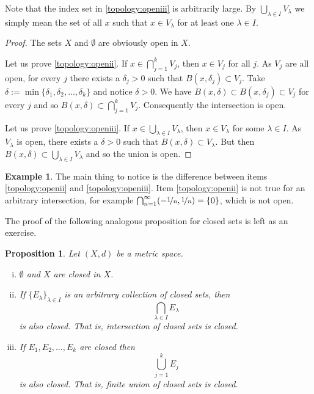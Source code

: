 \documentclass[12pt]{book}
\theoremstyle{plain}
\newtheorem{prop}[thm]{Proposition}
\theoremstyle{remark}
\theoremstyle{definition}
\theoremstyle{exercise}
\theoremstyle{example}
\newtheorem{example}[thm]{Example}
\begin{document}
Note that the index set in \ref{topology:openiii} is arbitrarily large.
By $\bigcup_{\lambda \in I} V_\lambda$ we simply mean the set of
all $x$ such that $x \in V_\lambda$ for at least one $\lambda \in I$.

\begin{proof}
The sets $X$ and $\emptyset$ are obviously open in $X$.

Let us prove \ref{topology:openii}.
If $x \in \bigcap_{j=1}^k V_j$, then $x \in V_j$ for all $j$.
As $V_j$ are all open, for every $j$ there exists a $\delta_j > 0$ 
such that $B(x,\delta_j) \subset V_j$.  Take $\delta := \min \{
\delta_1,\delta_2,\ldots,\delta_k \}$ and notice $\delta > 0$.  We have
$B(x,\delta) \subset B(x,\delta_j) \subset V_j$ for every $j$ and so
$B(x,\delta) \subset \bigcap_{j=1}^k V_j$.  Consequently the intersection is open.

Let us prove \ref{topology:openiii}.
If $x \in \bigcup_{\lambda \in I} V_\lambda$, then $x \in V_\lambda$ for some
$\lambda \in I$.
As $V_\lambda$ is open, there exists a $\delta > 0$
such that $B(x,\delta) \subset V_\lambda$.  But then
$B(x,\delta) \subset \bigcup_{\lambda \in I} V_\lambda$
and so the union is open.
\end{proof}

\begin{example}
The main thing to notice is the difference between
items
\ref{topology:openii} and \ref{topology:openiii}.
Item \ref{topology:openii} is not true for an arbitrary intersection,
for example $\bigcap_{n=1}^\infty (-\nicefrac{1}{n},\nicefrac{1}{n}) = \{ 0
\}$, which is not open.
\end{example}


The proof of the following analogous proposition for closed sets
is left as an exercise.

\begin{prop} \label{prop:topology:closed}
Let $(X,d)$ be a metric space.
\begin{enumerate}[(i)]
\item \label{topology:closedi} $\emptyset$ and $X$ are closed in $X$.
\item \label{topology:closedii} If $\{ E_\lambda \}_{\lambda \in I}$ is
an arbitrary collection of closed sets, then
\begin{equation*}
\bigcap_{\lambda \in I} E_\lambda
\end{equation*}
is also closed.  That is, intersection of closed sets is closed.
\item \label{topology:closediii} If $E_1, E_2, \ldots, E_k$ are closed then
\begin{equation*}
\bigcup_{j=1}^k E_j
\end{equation*}
is also closed.  That is, finite union of closed sets is closed.
\end{enumerate}
\end{prop}
\end{document}

